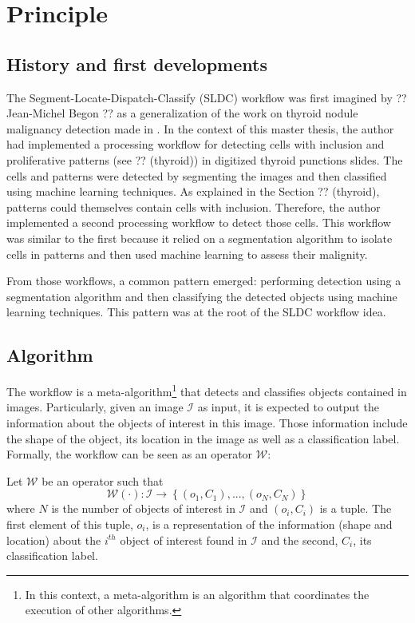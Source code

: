 \section{Principle}
\subsection{History and first developments}
\label{ssec:history_first_dev}
The Segment-Locate-Dispatch-Classify (SLDC) workflow was first imagined by ?? Jean-Michel Begon ?? as a generalization of the work on thyroid nodule malignancy detection made in \cite{adeblire2013}. In the context of this master thesis, the author had implemented a processing workflow for detecting cells with inclusion and proliferative patterns (see ?? (thyroid)) in digitized thyroid punctions slides. The cells and patterns were detected by segmenting the images and then classified using machine learning techniques. As explained in the Section ?? (thyroid), patterns could themselves contain cells with inclusion. Therefore, the author implemented a second processing workflow to detect those cells. This workflow was similar to the first because it relied on a segmentation algorithm to isolate cells in patterns and then used machine learning to assess their malignity. 

From those workflows, a common pattern emerged: performing detection using a segmentation algorithm and then classifying the detected objects using machine learning techniques. This pattern was at the root of the SLDC workflow idea. 

\subsection{Algorithm}
\label{ssec:workflow_algo}
The workflow is a meta-algorithm\footnote{In this context, a meta-algorithm is an algorithm that coordinates the execution of other algorithms.} that detects and classifies objects contained in images. Particularly, given an image $\mathcal{I}$ as input, it is expected to output the information about the objects of interest in this image. Those information include the shape of the object, its location in the image as well as a classification label. Formally, the workflow can be seen as an operator $\mathcal{W}$:

\begin{definition} Let $\mathcal{W}$ be an operator such that 
	\begin{equation}\label{eqn:workflow_operator}
		\mathcal{W}(\cdot) : \mathcal{I} \rightarrow \left\{(o_1,C_1),...,(o_N, C_N)\right\}
	\end{equation}
	where $N$ is the number of objects of interest in $\mathcal{I}$ and $(o_i, C_i)$ is a tuple. The first element of this tuple, $o_i$, is a representation of the information (shape and location) about the $i^{th}$ object of interest found in $\mathcal{I}$ and the second, $C_i$, its classification label. 
\end{definition}

